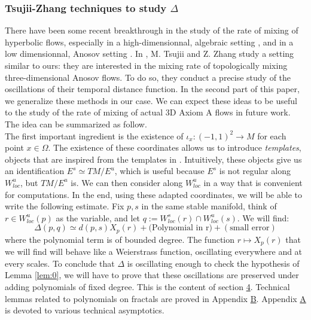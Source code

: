 \documentclass[a4paper]{article}
\theoremstyle{definition}
\begin{document}
\subsubsection{Tsujii-Zhang techniques to study $\Delta$}

There have been some recent breakthrough in the study of the rate of mixing of hyperbolic flows, especially in a high-dimensionnal, algebraic setting \cite{Kh23}, and in a low dimensionnal, Anosov setting \cite{TZ20}. In \cite{TZ20}, M. Tsujii and Z. Zhang study a setting similar to ours: they are interested in the mixing rate of topologically mixing three-dimensional Anosov flows. To do so, they conduct a precise study of the oscillations of their temporal distance function. In the second part of this paper, we generalize these methods in our  case. We can expect these ideas to be useful to the study of the rate of mixing of actual 3D Axiom A flows in future work. The idea can be summarized as follow. \\

The first important ingredient is the existence of  $\iota_x : (-1,1)^2 \rightarrow M$ for each point $x \in \Omega$. The existence of these coordinates allows us to introduce \emph{templates}, objects that are inspired from the templates in \cite{TZ20}. Intuitively, these objects give us an identification $E^s \simeq TM/E^u$, which is useful because $E^s$ is not regular along $W^u_{loc}$, but $TM/E^u$ is. We can then consider  along $W^u_{loc}$ in a way that is convenient for computations. In the end, using these adapted coordinates, we will be able to write the following estimate. Fix $p,s$ in the same stable manifold, think of $r \in W^u_{loc}(p)$ as the variable, and let $q := W^s_{loc}(r) \cap W^u_{loc}(s)$. We will find:
$$ \Delta(p,q) \simeq d(p,s) X_p(r) + \text{(Polynomial in r)} + (\text{small error}) $$
where the polynomial term is of bounded degree. The function $ r \mapsto X_p(r)$ that we will find will behave like a Weierstrass function, oscillating everywhere and at every scales. To conclude that $\Delta$ is oscillating enough to check the hypothesis of Lemma \ref{lem:0}, we will have to prove that these oscillations are preserved under adding polynomials of fixed degree. This is the content of section \hyperref[sec:4]{4}. Technical lemmas related to polynomials on fractals are proved in Appendix \hyperref[ap:B]{B}. Appendix \hyperref[ap:A]{A} is devoted to various technical asymptotics.
\end{document}
